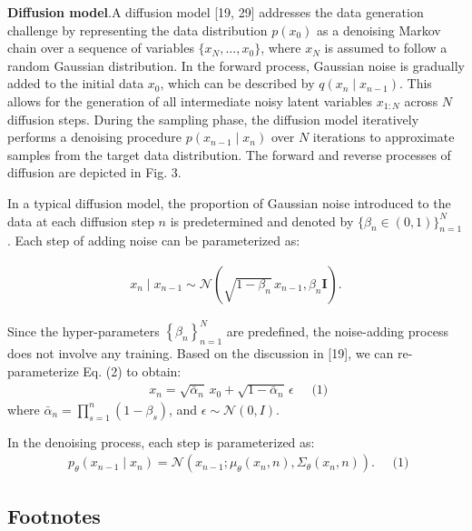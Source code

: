 \documentclass{article} %
\begin{document}
\textbf{Diffusion model}.A diffusion model [19, 29] addresses the data generation challenge by representing the data distribution \(p(x_0)\) as a denoising Markov chain over a sequence of variables \(\{x_N, \ldots, x_0\}\), where \(x_N\) is assumed to follow a random Gaussian distribution. In the forward process, Gaussian noise is gradually added to the initial data \(x_0\), which can be described by \(q(x_n \mid x_{n-1})\). This allows for the generation of all intermediate noisy latent variables \(x_{1:N}\) across \(N\) diffusion steps. During the sampling phase, the diffusion model iteratively performs a denoising procedure \(p(x_{n-1} \mid x_n)\) over \(N\) iterations to approximate samples from the target data distribution. The forward and reverse processes of diffusion are depicted in Fig. 3.

In a typical diffusion model, the proportion of Gaussian noise introduced to the data at each diffusion step \(n\) is predetermined and denoted by \(\{\beta_n \in (0, 1)\}_{n=1}^N\). Each step of adding noise can be parameterized as:

\begin{align}
     x_n \mid x_{n-1} \sim \mathcal{N}\left( \sqrt{1 - \beta_n} \, x_{n-1}, \beta_n \mathbf{I} \right).
\end{align}

Since the hyper-parameters $\left\{\beta_n\right\}_{n=1}^N$ are predefined, the noise-adding process does not involve any training. Based on the discussion in [19], we can re-parameterize Eq. (2) to obtain:
\begin{equation}
     \begin{aligned}
          x_n = \sqrt{\bar{\alpha}_n} \, x_0 + \sqrt{1 - \bar{\alpha}_n} \, \epsilon
     \end{aligned}
     \quad \text{(1)}
\end{equation}
where $\bar{\alpha}_n = \prod_{s=1}^n \left(1 - \beta_s\right)$, and $\epsilon \sim \mathcal{N}(0, I)$.

In the denoising process, each step is parameterized as:
\begin{equation}
     \begin{aligned}
          p_\theta\left(x_{n-1} \mid x_n\right) = \mathcal{N}\left(x_{n-1} ; \mu_\theta\left(x_n, n\right), \Sigma_\theta\left(x_n, n\right)\right).
     \end{aligned}
     \quad \text{(1)}
\end{equation}

\subsection{Footnotes}
\end{document}
